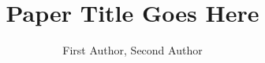 \documentclass[12pt]{article}
\title{Paper Title Goes Here}
\author{First Author\inst{1}, Second Author\inst{1}}
\begin{document}
\maketitle

\begin{abstract}
\end{abstract}

\begin{resumo}
\end{resumo}










\end{document}
